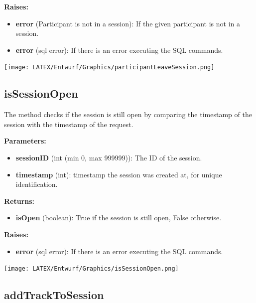 \documentclass[oneside, ngerman]{sdqtechreport}
\begin{document}
\textbf{Raises:}

\begin{itemize}
    \item \textbf{error} (Participant is not in a session): If the given participant is not in a session.
    \item \textbf{error} (sql error): If there is an error executing the SQL commands.
\end{itemize}

\begin{center}
   \texttt{[image: LATEX/Entwurf/Graphics/participantLeaveSession.png]} 
\end{center}



\subsection*{isSessionOpen}

The method checks if the session is still open by comparing the timestamp of the session with the timestamp of the request.

\textbf{Parameters:}

\begin{itemize}
    \item \textbf{sessionID} (int (min 0, max 999999)): The ID of the session.
    \item \textbf{timestamp} (int): timestamp the session was created at, for unique identification.
\end{itemize}

\textbf{Returns:}

\begin{itemize}
    \item \textbf{isOpen} (boolean): True if the session is still open, False otherwise.
\end{itemize}

\textbf{Raises:}

\begin{itemize}
    \item \textbf{error} (sql error): If there is an error executing the SQL commands.
\end{itemize}

\begin{center}
   \texttt{[image: LATEX/Entwurf/Graphics/isSessionOpen.png]} 
\end{center}



\subsection*{addTrackToSession}
\end{document}
